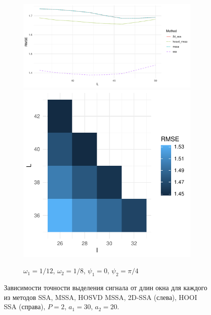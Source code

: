 \documentclass[specialist,
    substylefile = spbu_report.rtx,
    subf,href,colorlinks=true, 12pt]{disser}
\theoremstyle{plain}
\theoremstyle{definition}
\newtheorem{example}{Пример}[section]
\theoremstyle{remark}
\begin{document}
\begin{figure}
\begin{subfigure}{\linewidth}
        \end{subfigure}
        \begin{subfigure}{\linewidth}
            \includegraphics[width=.66\linewidth]{two-series-third}\hfill
            \includegraphics[width=.34\linewidth]{two-series-third_hooi}
            \caption{$\omega_1=1/12$, $\omega_2=1/8$, $\psi_1=0$, $\psi_2=\pi / 4$}
        \end{subfigure}
        \caption{Зависимости точности выделения сигнала от длин окна для каждого из методов
        SSA, MSSA, HOSVD MSSA, 2D-SSA (слева), HOOI SSA (справа), $P=2$, $a_1=30$, $a_2 = 20$.}
        \label{fig:two-series-example}
    \end{figure}

\end{document}
